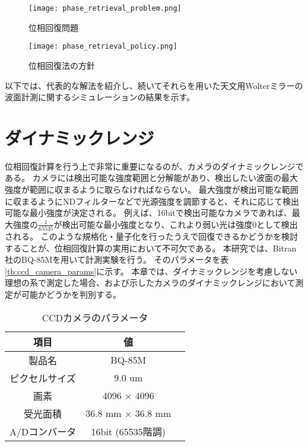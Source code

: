 \begin{figure}[!ht]
\centering
\texttt{[image: phase\_retrieval\_problem.png]}
\caption{位相回復問題}
\label{fig:phase_retrieval_problem}
\end{figure}

\begin{figure}[!ht]
\centering
\texttt{[image: phase\_retrieval\_policy.png]}
\caption{位相回復法の方針}
\label{fig:phase_retrieval_policy}
\end{figure}

以下では、代表的な解法を紹介し、続いてそれらを用いた天文用Wolterミラーの波面計測に関するシミュレーションの結果を示す。


\clearpage
\newpage

\section{ダイナミックレンジ}
位相回復計算を行う上で非常に重要になるのが、カメラのダイナミックレンジである。
カメラには検出可能な強度範囲と分解能があり、検出したい波面の最大強度が範囲に収まるように取らなければならない。
最大強度が検出可能な範囲に収まるようにNDフィルターなどで光源強度を調節すると、それに応じて検出可能な最小強度が決定される。
例えば、16bitで検出可能なカメラであれば、最大強度の$\frac{1}{65535}$が検出可能な最小強度となり、これより弱い光は強度0として検出される。
このような規格化・量子化を行ったうえで回復できるかどうかを検討することが、位相回復計算の実用において不可欠である。
本研究では、Bitran社のBQ-85Mを用いて計測実験を行う。
そのパラメータを表\ref{tb:ccd_camera_params}に示す。
本章では、ダイナミックレンジを考慮しない理想の系で測定した場合、および示したカメラのダイナミックレンジにおいて測定が可能かどうかを判別する。

\begin{table}
\begin{center}
  \begin{tabular}{|c|c|l|} \hline
    項目 & 値 \\ \hline
    製品名 & BQ-85M \\
    ピクセルサイズ & 9.0 um \\
    画素 & 4096 $\times$ 4096 \\
    受光面積 & 36.8 mm $\times$ 36.8 mm \\
    A/Dコンバータ & 16bit (65535階調) \\ \hline
  \end{tabular}
  \caption{CCDカメラのパラメータ}
  \label{tb:wolter_params}
\end{center}
\end{table}



